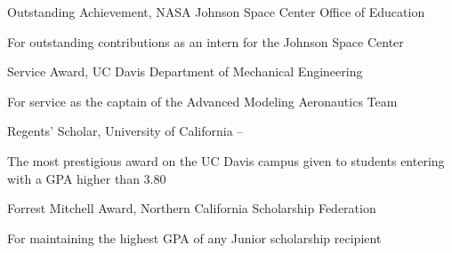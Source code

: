 \documentclass[letterpaper,MMMyyyy,nonstop]{simpleresumecv}
\begin{document}
\begin{body}
\Gap
\BulletItem
Outstanding Achievement,
NASA Johnson Space Center Office of Education
\hfill
\begin{detail}
\SubItem
For outstanding contributions as an intern for the Johnson Space Center
\end{detail}

\Gap
\BulletItem
Service Award,
UC Davis Department of Mechanical Engineering
\hfill
\begin{detail}
\SubItem
For service as the captain of the Advanced Modeling Aeronautics Team
\end{detail}

\Gap
\BulletItem
Regents' Scholar,
University of California
\hfill
{} --
\begin{detail}
\SubItem
The most prestigious award on the UC Davis campus given to students entering with a GPA higher than 3.80
\end{detail}

\Gap
\BulletItem
Forrest Mitchell Award,
Northern California Scholarship Federation
\hfill
{}
\begin{detail}
\SubItem
For maintaining the highest GPA of any Junior scholarship recipient
\end{detail}













\end{body}
\end{document}
